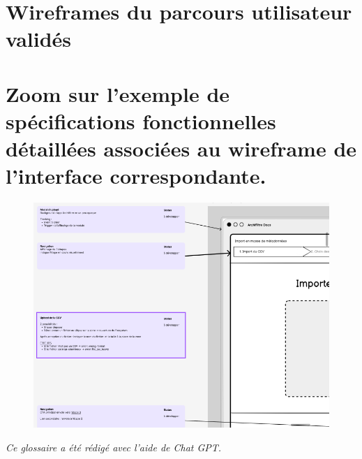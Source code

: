 \documentclass[a4paper,12pt,twoside]{book}
\begin{document}
	\chapter[Wireframes validés]{Wireframes du parcours utilisateur validés}
	
	\label{annexe9}

	\chapter[Zoom spécifications fonctionnelles]{Zoom sur l'exemple de spécifications fonctionnelles détaillées associées au \gls{wireframe} de l'interface correspondante.}
	\begin{figure}[h]
		\centering
		\includegraphics[scale=0.55]{annexes/annexe9.png}
		\label{annexe10}
	\end{figure}

\newpage{\pagestyle{empty}\cleardoublepage}


\backmatter %

\printglossaries
\textit{Ce glossaire a été rédigé avec l'aide de Chat GPT.}

\listoffigures
\tableofcontents
\end{document}
